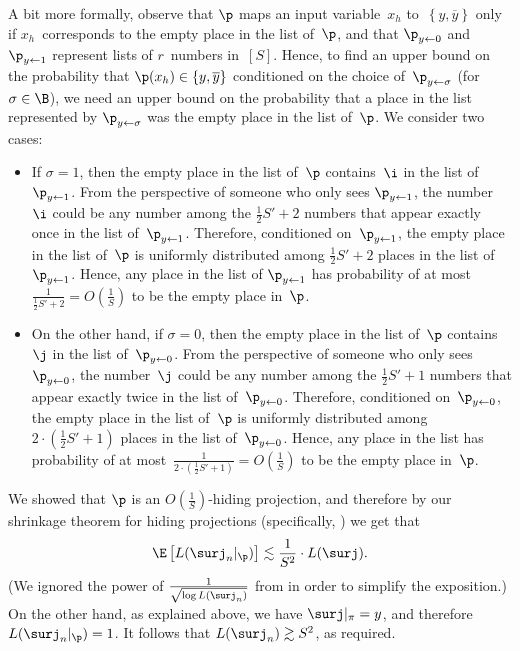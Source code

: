 \documentclass{toc}
\begin{document}
A bit more formally, observe that $\p$ maps an input variable~$x_{h}$
to~$\left\{ y,\overline{y}\right\} $ only if $x_{h}$~corresponds
to the empty place in the list of~$\p$, and that $\p_{y\gets0}$
and $\p_{y\gets1}$ represent lists of $r$~numbers in~$\left[S\right]$.
Hence, to %
find an upper bound on  %
the probability that 
$\p(x_{h})\in\left\{ y,\overline{y}\right\} $
conditioned on the choice of~$\p_{y\gets\sigma}$ (for $\sigma\in\B$),
we %
need an upper bound on  %
the probability that a place in the list represented
by $\p_{y\gets\sigma}$ was the empty place in the list of~$\p$.
We consider two cases:
\begin{itemize}
\item If $\sigma=1$, then the empty place in the list of~$\p$ contains~$\i$
in the list of~$\p_{y\gets1}$. From the perspective of someone who
only sees $\p_{y\gets1}$, the number~$\i$ could be any number among
the $\frac{1}{2}S'+2$ numbers that appear exactly once in the list
of~$\p_{y\gets1}$. Therefore, conditioned on~$\p_{y\gets1}$, the
empty place in the list of~$\p$ is uniformly distributed among $\frac{1}{2}S'+2$
places in the list of~$\p_{y\gets1}$. Hence, any place in the list
of $\p_{y\gets1}$ has probability of at most~$\frac{1}{\frac{1}{2}S'+2}=O\left(\frac{1}{S}\right)$
to be the empty place in~$\p$.
\item On the other hand, if $\sigma=0$, %
%
%
%
then the empty place in the list
of~$\p$ contains~$\j$ in the list of~$\p_{y\gets0}$. From the
perspective of someone who only sees~$\p_{y\gets0}$, the number~$\j$
could be any number among the $\frac{1}{2}S'+1$ numbers that appear
exactly twice in the list of~$\p_{y\gets0}$. Therefore, conditioned
on~$\p_{y\gets0}$, the empty place in the list of~$\p$ is uniformly
distributed among $2\cdot\left(\frac{1}{2}S'+1\right)$ places in
the list of~$\p_{y\gets0}$. Hence, any place in the list has probability
of at most~$\frac{1}{2\cdot\left(\frac{1}{2}S'+1\right)}=O\left(\frac{1}{S}\right)$
to be the empty place in~$\p$.
\end{itemize}
We showed that $\p$ is an $O(\frac{1}{S})$-hiding projection, and
therefore by our shrinkage theorem for hiding projections (specifically,
) we get that
\[
\E\left[L(\surj_{n}|_{\p})\right]\lesssim\frac{1}{S^{2}}\cdot L(\surj).
\]
(We ignored the power of $\frac{1}{\sqrt{\log L(\surj_{n})}}$ from
 in order to simplify the exposition.)
On the other hand, as explained above, we have $\surj|_{\pi}=y$,
and therefore $L(\surj_{n}|_{\p})=1$. It follows that $L(\surj_{n})\gtrsim S^{2}$, as
required.
\end{document}
